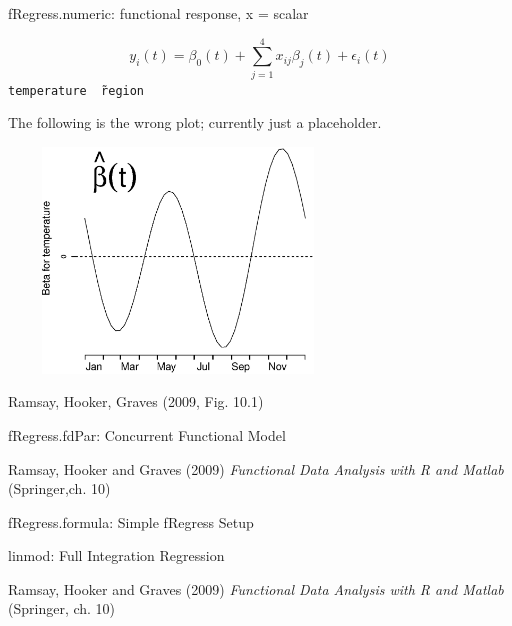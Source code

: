 \documentclass[compress]{beamer}
\begin{document}

\begin{frame}{fRegress.numeric:  functional response, x = scalar}

\[ y_i(t) = \beta_0(t) + \sum_{j=1}^4 x_{ij} \beta_j(t) + \epsilon_i(t) \]
\texttt{temperature \~\ region}

The following is the wrong plot;  currently just a placeholder.  

\includegraphics[height=6cm, width=9cm]{figs/precbeta5b}

Ramsay, Hooker, Graves (2009, Fig. 10.1)

\end{frame}


\begin{frame}{fRegress.fdPar:  Concurrent Functional Model}

Ramsay, Hooker and Graves (2009)
\emph{Functional Data Analysis with R and Matlab}
(Springer,ch. 10)

\end{frame}


\begin{frame}{fRegress.formula:  Simple fRegress Setup}

\end{frame}


\begin{frame}{linmod:  Full Integration Regression}

Ramsay, Hooker and Graves (2009)
\emph{Functional Data Analysis with R and Matlab}
(Springer, ch. 10)

\end{frame}
\end{document}
